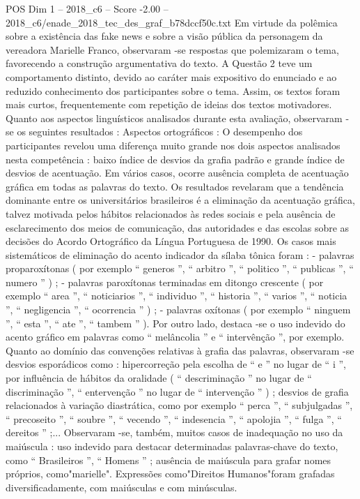\begin{textsample}{POS Dim 1 – 2018\_c6 – Score -2.00 – 2018\_c6/enade\_2018\_tec\_des\_graf\_b78dccf50c.txt}
Em virtude da polêmica sobre a existência das fake news e sobre a visão pública da personagem da vereadora Marielle Franco, observaram -se respostas que polemizaram o tema, favorecendo a construção argumentativa do texto.
A Questão 2 teve um comportamento distinto, devido ao caráter mais expositivo do enunciado e ao reduzido conhecimento dos participantes sobre o tema.
Assim, os textos foram mais curtos, frequentemente com repetição de ideias dos textos motivadores.
Quanto aos aspectos linguísticos analisados durante esta avaliação, observaram -se os seguintes resultados : Aspectos ortográficos : O desempenho dos participantes revelou uma diferença muito grande nos dois aspectos analisados nesta competência : baixo índice de desvios da grafia padrão e grande índice de desvios de acentuação.
Em vários casos, ocorre ausência completa de acentuação gráfica em todas as palavras do texto.
Os resultados revelaram que a tendência dominante entre os universitários brasileiros é a eliminação da acentuação gráfica, talvez motivada pelos hábitos relacionados às redes sociais e pela ausência de esclarecimento dos meios de comunicação, das autoridades e das escolas sobre as decisões do Acordo Ortográfico da Língua Portuguesa de 1990.
Os casos mais sistemáticos de eliminação do acento indicador da sílaba tônica foram : - palavras proparoxítonas ( por exemplo “ generos ”, “ arbitro ”, “ politico ”, “ publicas ”, “ numero ” ) ; - palavras paroxítonas terminadas em ditongo crescente ( por exemplo “ area ”, “ noticiarios ”, “ individuo ”, “ historia ”, “ varios ”, “ noticia ”, “ negligencia ”, “ ocorrencia ” ) ; - palavras oxítonas ( por exemplo “ ninguem ”, “ esta ”, “ ate ”, “ tambem ” ).
Por outro lado, destaca -se o uso indevido do acento gráfico em palavras como “ melâncolia ” e “ intervênção ”, por exemplo.
Quanto ao domínio das convenções relativas à grafia das palavras, observaram -se desvios esporádicos como : hipercorreção pela escolha de “ e ” no lugar de “ i ”, por influência de hábitos da oralidade ( “ descriminação ” no lugar de “ discriminação ”, “ entervenção ” no lugar de “ intervenção ” ) ; desvios de grafia relacionados à variação diastrática, como por exemplo “ perca ”, “ subjulgadas ”, “ precoseito ”, “ soubre ”, “ vecendo ”, “ indesencia ”, “ apolojia ”, “ fulga ”, “ dereitos ” ;...
Observaram -se, também, muitos casos de inadequação no uso da maiúscula : uso indevido para destacar determinadas palavras-chave do texto, como “ Brasileiros ”, “ Homens ” ; ausência de maiúscula para grafar nomes próprios, como"marielle".
Expressões como"Direitos Humanos"foram grafadas diversificadamente, com maiúsculas e com minúsculas.

\end{textsample}
